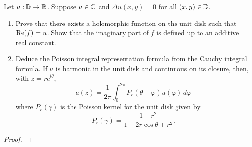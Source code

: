 \documentclass[../hw2]{subfiles}
\begin{document}
\begin{problem}
Let $u: \mathbb{D} \to \mathbb{R}$. Suppose $u\in \mathbb{C}$ and $\Delta u(x,y)=0$ for all $(x,y)\in \mathbb{D}$.
\begin{enumerate}[label=(\alph*)]
	\item Prove that there exists a holomorphic function on the unit disk such that $\operatorname{Re}(f)=u$.
	      Show that the imaginary part of $f$ is defined up to an additive real constant.
	\item Deduce the Poisson integral representation formula from the Cauchy integral formula.
	      If $u$ is harmonic in the unit disk and continuous on its closure, then, with $z=re^{i\theta}$, \[
		      u(z)=\frac{1}{2\pi}\int_{0}^{2\pi} P_r(\theta-\varphi)u(\varphi) \,d\varphi
	      \] where $P_r(\gamma)$ is the Poisson kernel for the unit disk given by  \[
		      P_r(\gamma) = \frac{1-r^2}{1-2r\cos{\theta}+r^2}
		      .\]
\end{enumerate}
\end{problem}
\begin{proof}

\end{proof}
\end{document}
